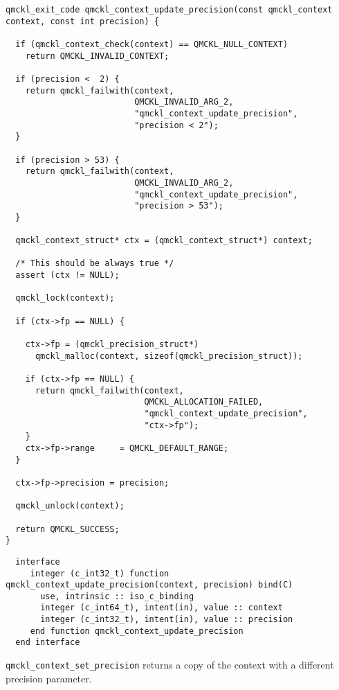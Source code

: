\begin{verbatim}
qmckl_exit_code qmckl_context_update_precision(const qmckl_context context, const int precision) {

  if (qmckl_context_check(context) == QMCKL_NULL_CONTEXT)
    return QMCKL_INVALID_CONTEXT;

  if (precision <  2) {
    return qmckl_failwith(context,
                          QMCKL_INVALID_ARG_2,
                          "qmckl_context_update_precision",
                          "precision < 2");
  }

  if (precision > 53) {
    return qmckl_failwith(context,
                          QMCKL_INVALID_ARG_2,
                          "qmckl_context_update_precision",
                          "precision > 53");
  }

  qmckl_context_struct* ctx = (qmckl_context_struct*) context;

  /* This should be always true */
  assert (ctx != NULL);

  qmckl_lock(context);

  if (ctx->fp == NULL) {

    ctx->fp = (qmckl_precision_struct*)
      qmckl_malloc(context, sizeof(qmckl_precision_struct));

    if (ctx->fp == NULL) {
      return qmckl_failwith(context,
                            QMCKL_ALLOCATION_FAILED,
                            "qmckl_context_update_precision",
                            "ctx->fp");
    }
    ctx->fp->range     = QMCKL_DEFAULT_RANGE;
  }

  ctx->fp->precision = precision;

  qmckl_unlock(context);

  return QMCKL_SUCCESS;
}
\end{verbatim}

\begin{verbatim}
  interface
     integer (c_int32_t) function qmckl_context_update_precision(context, precision) bind(C)
       use, intrinsic :: iso_c_binding
       integer (c_int64_t), intent(in), value :: context
       integer (c_int32_t), intent(in), value :: precision
     end function qmckl_context_update_precision
  end interface
\end{verbatim}

\texttt{qmckl\_context\_set\_precision} returns a copy of the context with a
different precision parameter.


